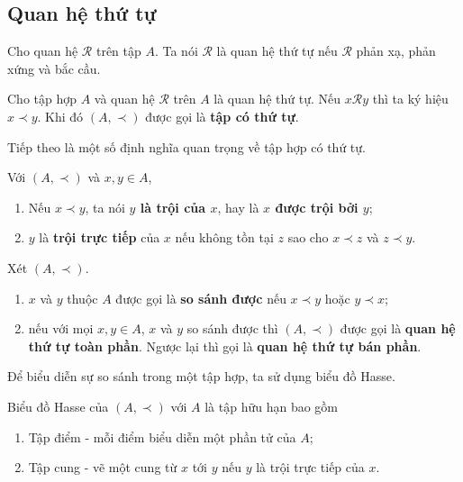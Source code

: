 \subsection*{Quan hệ thứ tự}

\begin{definition}
    Cho quan hệ $\mathcal{R}$ trên tập $A$. Ta nói $\mathcal{R}$ là quan hệ thứ tự nếu $\mathcal{R}$ phản xạ,  phản xứng và bắc cầu.
\end{definition}

\begin{definition}
    Cho tập hợp $A$ và quan hệ $\mathcal{R}$ trên $A$ là quan hệ thứ tự. Nếu $x \mathcal{R} y$ thì ta ký hiệu $x \prec y$. Khi đó $(A, \prec)$ được gọi là \textbf{tập có  thứ tự}.
\end{definition}

Tiếp theo là một số định nghĩa quan trọng về tập hợp có thứ tự.

\begin{definition}
    Với $(A, \prec)$ và $x, y \in A$,
    \begin{enumerate}
        \item Nếu $x \prec y$, ta nói \textbf{$y$ là trội của $x$}, hay là \textbf{$x$ được trội bởi $y$};
        \item $y$ là \textbf{trội trực tiếp} của $x$ nếu không tồn tại $z$ sao cho $x \prec z$ và $z \prec y$.
    \end{enumerate}
\end{definition}

\begin{definition}
    Xét $(A, \prec)$.
    \begin{enumerate}
        \item $x$ và $y$ thuộc $A$ được gọi là \textbf{so sánh được} nếu $x \prec y$ hoặc $y \prec x$;
        \item nếu với mọi $x, y \in A$, $x$ và $y$ so sánh được thì $(A, \prec)$ được gọi là \textbf{quan hệ thứ tự toàn phần}. Ngược lại thì gọi là \textbf{quan hệ thứ tự bán phần}.
    \end{enumerate}
\end{definition}

Để biểu diễn sự so sánh trong một tập hợp, ta sử dụng biểu đồ Hasse.

\begin{definition}
    Biểu đồ Hasse của $(A, \prec)$ với $A$ là tập hữu hạn bao gồm
    \begin{enumerate}
        \item Tập điểm - mỗi điểm biểu diễn một phần tử của $A$;
        \item Tập cung - vẽ một cung từ $x$ tới $y$ nếu $y$ là trội trực tiếp của $x$.
    \end{enumerate}
\end{definition}


